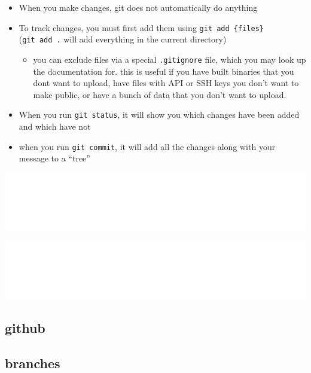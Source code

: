 \documentclass[
]{article}
\providecommand{\tightlist}{%
  \setlength{\itemsep}{0pt}\setlength{\parskip}{0pt}}
\begin{document}
\begin{itemize}
\tightlist
\item
  When you make changes, git does not automatically do anything
\item
  To track changes, you must first add them using
  \texttt{git\ add\ \{files\}} (\texttt{git\ add\ .} will add everything
  in the current directory)

  \begin{itemize}
  \tightlist
  \item
    you can exclude files via a special \texttt{.gitignore} file, which
    you may look up the documentation for. this is useful if you have
    built binaries that you dont want to upload, have files with API or
    SSH keys you don't want to make public, or have a bunch of data that
    you don't want to upload.
  \end{itemize}
\item
  When you run \texttt{git\ status}, it will show you which changes have
  been added and which have not
\item
  when you run \texttt{git\ commit}, it will add all the changes along
  with your message to a ``tree''
\end{itemize}

\includegraphics{mermaid-images/20b80f24a3a6ddcdc2db54e00763d5117b2df660.png}

\includegraphics{mermaid-images/20b80f24a3a6ddcdc2db54e00763d5117b2df660.png}

\hypertarget{github}{%
\subsection{github}\label{github}}

\hypertarget{branches}{%
\subsection{branches}\label{branches}}
\end{document}
